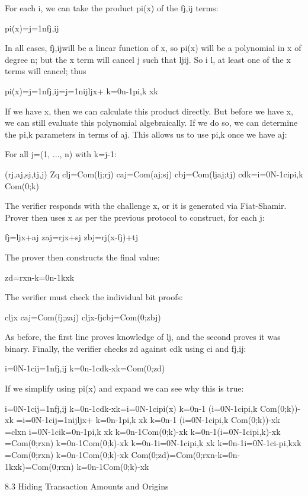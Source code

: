 \documentclass{article}
\begin{document}
For each i, we can take the product pi(x) of the fj,ij terms:

	pi(x)=j=1nfj,ij

In all cases, fj,ijwill be a linear function of x, so pi(x) will be a polynomial in x  of degree n; but the x term will cancel  j such that ljij.  So  i l, at least one of the x terms will cancel; thus

	pi(x)=j=1nfj,ij=j=1nijljx+ k=0n-1pi,k xk

If we have x, then we can calculate this product directly.  But before we have x, we can still evaluate this polynomial algebraically.  If we do so, we can determine the pi,k parameters in terms of aj.  This allows us to use pi,k once we have aj:

For all j=(1, ..., n) with k=j-1:

	(rj,aj,sj,tj,j) Zq
	clj=Com(lj;rj)
	caj=Com(aj;sj)
	cbj=Com(ljaj;tj)
	cdk=i=0N-1cipi,k Com(0;k)

The verifier responds with the challenge x, or it is generated via Fiat-Shamir.  Prover then uses x as per the previous protocol to construct, for each j:

	fj=ljx+aj
	zaj=rjx+sj
	zbj=rj(x-fj)+tj

The prover then constructs the final value:

	zd=rxn-k=0n-1kxk

The verifier must check the individual bit proofs:

	cljx caj=Com(fj;zaj)
	cljx-fjcbj=Com(0;zbj)

As before, the first line proves knowledge of lj, and the second proves it was binary.  Finally, the verifier checks zd against cdk using ci and fj,ij:

	i=0N-1cij=1nfj,ij  k=0n-1cdk-xk=Com(0;zd)

If we simplify using pi(x) and expand we can see why this is true:

	i=0N-1cij=1nfj,ij  k=0n-1cdk-xk=i=0N-1cipi(x)  k=0n-1 (i=0N-1cipi,k Com(0;k))-xk
	                            =i=0N-1cij=1nijljx+ k=0n-1pi,k xk  k=0n-1 (i=0N-1cipi,k Com(0;k))-xk
	                            =clxn i=0N-1cik=0n-1pi,k xk  k=0n-1Com(0;k)-xk k=0n-1(i=0N-1cipi,k)-xk
	                            =Com(0;rxn) k=0n-1Com(0;k)-xk  k=0n-1i=0N-1cipi,k xk  k=0n-1i=0N-1ci-pi,kxk
	                            =Com(0;rxn) k=0n-1Com(0;k)-xk
	Com(0;zd)=Com(0;rxn-k=0n-1kxk)=Com(0;rxn) k=0n-1Com(0;k)-xk


8.3 Hiding Transaction Amounts and Origins
 
\end{document}
